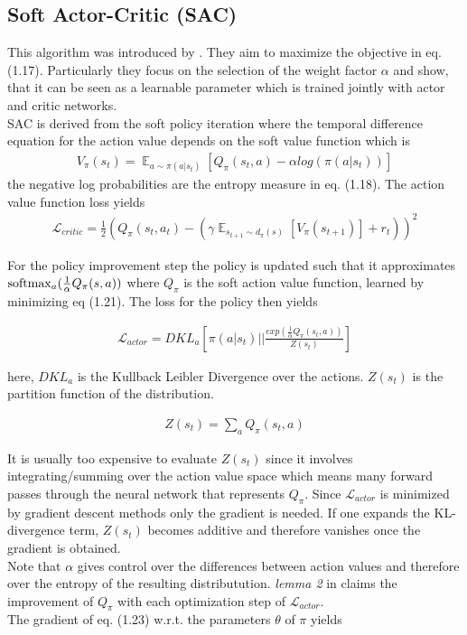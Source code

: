 \subsection{Soft Actor-Critic (SAC)}\label{ssec:sac}
This algorithm was introduced by \cite{haarnoja2018soft}. They aim to maximize the objective in eq. (1.17). Particularly they focus on the selection of the weight factor $\alpha$ and show, that it can be seen as a learnable parameter which is trained jointly with actor and critic networks.\\
SAC is derived from the soft policy iteration where the temporal difference equation for the action value depends on the soft value function which is
\begin{align}
	V_{\pi}(s_t) = \mathop{\mathbb{E}}_{a \sim \pi(a|s_t)} \left[ Q_{\pi}(s_t, a) - \alpha log( \pi(a|s_t)) \right]
\end{align}
the negative log probabilities are the entropy measure in eq. (1.18). The action value function loss yields
\begin{align}
	\mathcal{L}_{critic} = \frac{1}{2}(Q_{\pi}(s_t, a_t) - (\gamma \mathop{\mathbb{E}}_{s_{t+1} \sim d_{\pi}(s)} \left[ V_{\pi}(s_{t+1})\right] + r_t)) ^ 2
\end{align}

For the policy improvement step the policy is updated such that it approximates $\operatorname*{softmax}_a(\frac{1}{\alpha}Q_{\pi}(s, a))$ where $Q_{\pi}$ is the soft action value function, learned by minimizing eq (1.21). The loss for the policy then yields

\begin{align}
\mathcal{L}_{actor} = DKL_{a}\left[ \pi(a| s_t) \bigg|\bigg| \frac{exp(\frac{1}{\alpha} Q_{\pi}(s_t, a))}{Z(s_t)} \right]
\end{align}

here, $DKL_{a}$ is the Kullback Leibler Divergence over the actions. $Z(s_t)$ is the partition function of the distribution. 

\begin{align}
	Z(s_t) = \sum_a Q_{\pi} (s_t, a)
\end{align}

It is usually too expensive to evaluate $Z(s_t)$ since it involves integrating/summing over the action value space which means many forward passes through the neural network that represents $Q_{\pi}$. Since $\mathcal{L}_{actor}$ is minimized by gradient descent methods only the gradient is needed. If one expands the KL-divergence term, $Z(s_t)$ becomes additive and therefore vanishes once the gradient is obtained.\\
Note that $\alpha$ gives control over the differences between action values and therefore over the entropy of the resulting distributution. \emph{lemma 2} in \cite{haarnoja2018soft} claims the improvement of $Q_{\pi}$ with each optimization step of $\mathcal{L}_{actor}$.\\
The gradient of eq. (1.23) w.r.t. the parameters $\theta$ of $\pi$ yields

